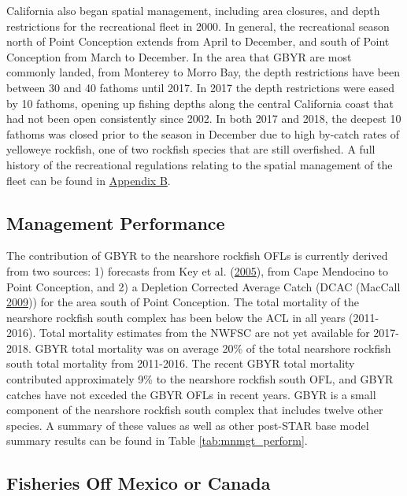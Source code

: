 \documentclass[12pt,]{article}
\begin{document}
California also began spatial management, including area closures, and
depth restrictions for the recreational fleet in 2000. In general, the
recreational season north of Point Conception extends from April to
December, and south of Point Conception from March to December. In the
area that GBYR are most commonly landed, from Monterey to Morro Bay, the
depth restrictions have been between 30 and 40 fathoms until 2017. In
2017 the depth restrictions were eased by 10 fathoms, opening up fishing
depths along the central California coast that had not been open
consistently since 2002. In both 2017 and 2018, the deepest 10 fathoms
was closed prior to the season in December due to high by-catch rates of
yelloweye rockfish, one of two rockfish species that are still
overfished. A full history of the recreational regulations relating to
the spatial management of the fleet can be found in
\protect\hyperlink{appendix-b.-californias-recreational-fishery-regulations}{Appendix
B}.

\subsection{Management Performance}\label{management-performance-1}

The contribution of GBYR to the nearshore rockfish OFLs is currently
derived from two sources: 1) forecasts from Key et al.
(\protect\hyperlink{ref-Key2005}{2005}), from Cape Mendocino to Point
Conception, and 2) a Depletion Corrected Average Catch (DCAC (MacCall
\protect\hyperlink{ref-MacCall2009}{2009})) for the area south of Point
Conception. The total mortality of the nearshore rockfish south complex
has been below the ACL in all years (2011-2016). Total mortality
estimates from the NWFSC are not yet available for 2017-2018. GBYR total
mortality was on average 20\% of the total nearshore rockfish south
total mortality from 2011-2016. The recent GBYR total mortality
contributed approximately 9\% to the nearshore rockfish south OFL, and
GBYR catches have not exceded the GBYR OFLs in recent years. GBYR is a
small component of the nearshore rockfish south complex that includes
twelve other species. A summary of these values as well as other
post-STAR base model summary results can be found in Table
\ref{tab:mnmgt_perform}.

\subsection{Fisheries Off Mexico or
Canada}\label{fisheries-off-mexico-or-canada}
\end{document}
